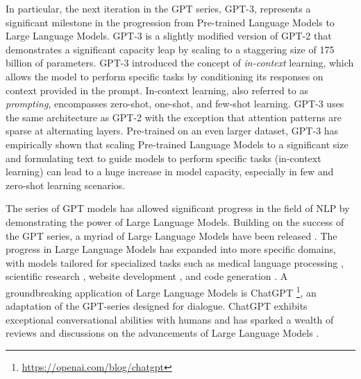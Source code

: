 In particular, the next iteration in the \ac{GPT} series, \ac{GPT}-3, represents a significant milestone in the progression from Pre-trained Language Models to Large Language Models. \ac{GPT}-3 is a slightly modified version of \ac{GPT}-2 that demonstrates a significant capacity leap by scaling to a staggering size of 175 billion of parameters. \ac{GPT}-3 introduced the concept of \textit{in-context} learning, which allows the model to perform specific tasks by conditioning its responses on context provided in the prompt. In-context learning, also referred to as \textit{prompting}, encompasses zero-shot, one-shot, and few-shot learning. \ac{GPT}-3 uses the same architecture as \ac{GPT}-2 with the exception that attention patterns are sparse at alternating layers. Pre-trained on an even larger dataset, \ac{GPT}-3 has empirically shown that scaling Pre-trained Language Models to a significant size and formulating text to guide models to perform specific tasks (in-context learning) can lead to a huge increase in model capacity, especially in few and zero-shot learning scenarios.



The series of \ac{GPT} models has allowed significant progress in the field of \ac{NLP} by demonstrating the power of Large Language Models. Building on the success of the \ac{GPT} series, a myriad of Large Language Models have been released \citep{scao2022bloom, chowdhery2022palm, touvron2023llama}. The progress in Large Language Models has expanded into more specific domains, with models tailored for specialized tasks such as medical language processing \citep{thirunavukarasu2023large}, scientific research \citep{wang2023scientific}, website development \citep{wang2023software}, and code generation \citep{xu2022systematic}. A groundbreaking application of Large Language Models is ChatGPT \footnote{\url{https://openai.com/blog/chatgpt}}, an adaptation of the \ac{GPT}-series designed for dialogue. ChatGPT exhibits exceptional conversational abilities with humans and has sparked a wealth of reviews and discussions on the advancements of Large Language Models \citep{zhao2023survey, mohamadi2023chatgpt, hadi2023large}. 

